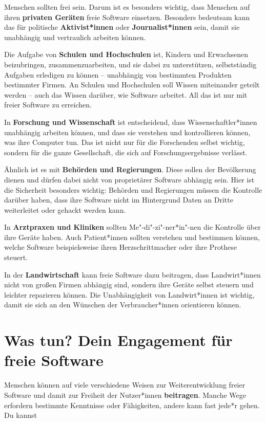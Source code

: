 \documentclass[a5paper,12pt]{scrartcl}
\begin{document}
Menschen sollten frei sein. Darum ist es besonders wichtig, dass
Menschen auf ihren \textbf{privaten Geräten} freie Software
einsetzen. Besonders bedeutsam kann das für politische
\textbf{Aktivist*innen} oder \textbf{Journalist*innen} sein, damit sie
unabhängig und vertraulich arbeiten können.

Die Aufgabe von \textbf{Schulen und Hochschulen} ist, Kindern und
Erwachsenen beizubringen, zusammenzuarbeiten, und sie dabei zu
unterstützen, selbstständig Aufgaben erledigen zu können -- unabhängig
von bestimmten Produkten bestimmter Firmen. An Schulen und Hochschulen
soll Wissen miteinander geteilt werden -- auch das Wissen darüber, wie
Software arbeitet. All das ist nur mit freier Software zu erreichen.

In \textbf{Forschung und Wissenschaft} ist entscheidend, dass
Wissenschaftler*innen unabhängig arbeiten können, und dass sie
verstehen und kontrollieren können, was ihre Computer tun. Das ist
nicht nur für die Forschenden selbst wichtig, sondern für die ganze
Gesellschaft, die sich auf Forschungsergebnisse verlässt.

Ähnlich ist es mit \textbf{Behörden und Regierungen}. Diese sollen der
Bevölkerung dienen und dürfen dabei nicht von proprietärer Software
abhängig sein. Hier ist die Sicherheit besonders wichtig: Behörden und
Regierungen müssen die Kontrolle darüber haben, dass ihre Software
nicht im Hintergrund Daten an Dritte weiterleitet oder gehackt werden
kann.

In \textbf{Arztpraxen und Kliniken} sollten Me"-di"-zi"-ner*in"-nen
die Kontrolle über ihre Geräte haben. Auch Patient*innen sollten
verstehen und bestimmen können, welche Software beispielsweise ihren
Herzschrittmacher oder ihre Prothese steuert.

In der \textbf{Landwirtschaft} kann freie Software dazu beitragen,
dass Landwirt*innen nicht von großen Firmen abhängig sind, sondern
ihre Geräte selbst steuern und leichter reparieren können. Die
Unabhängigkeit von Landwirt*innen ist wichtig, damit sie sich an den
Wünschen der Verbraucher*innen orientieren können.


\section{Was tun? Dein Engagement für freie Software}

Menschen können auf viele verschiedene Weisen zur Weiterentwicklung
freier Software und damit zur Freiheit der Nutzer*innen
\textbf{beitragen}. Manche Wege erfordern bestimmte Kenntnisse oder
Fähigkeiten, andere kann fast jede*r gehen. Du kannst
\end{document}
